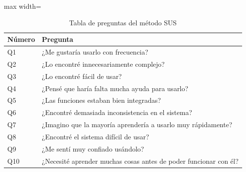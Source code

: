 \begin{table}[h!tb]
  \centering
  \begin{adjustbox}{max width=\textwidth}
    \begin{tabular}{|>{\centering\arraybackslash}p{2cm}|>{\centering\arraybackslash}p{10cm}|}
      \hline
      \textbf{Número} & \textbf{Pregunta}                                                \\ \hline

      Q1              & ¿Me gustaría usarlo con frecuencia?                              \\ \hline

      Q2              & ¿Lo encontré innecesariamente complejo?                          \\ \hline

      Q3              & ¿Lo encontré fácil de usar?                                      \\ \hline

      Q4              & ¿Pensé que haría falta mucha ayuda para usarlo?                  \\ \hline

      Q5              & ¿Las funciones estaban bien integradas?                          \\ \hline

      Q6              & ¿Encontré demasiada inconsistencia en el sistema?                \\ \hline

      Q7              & ¿Imagino que la mayoría aprendería a usarlo muy rápidamente?     \\ \hline

      Q8              & ¿Encontré el sistema difícil de usar?                            \\ \hline

      Q9              & ¿Me sentí muy confiado usándolo?                                 \\ \hline

      Q10             & ¿Necesité aprender muchas cosas antes de poder funcionar con él? \\ \hline
    \end{tabular}
  \end{adjustbox}
  \caption{Tabla de preguntas del método SUS}
  \label{tab:preguntasSUS}
\end{table}

